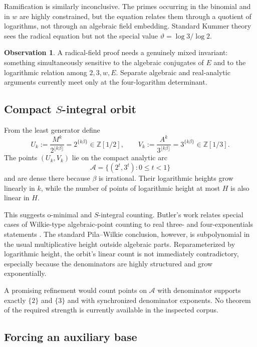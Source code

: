 \documentclass[11pt,oneside]{article}
\theoremstyle{definition}
\newtheorem{observation}[theorem]{Observation}
\theoremstyle{remark}
\newcommand{\Z}{\mathbb Z}
\newcommand{\thetaq}{\vartheta}
\begin{document}
Ramification is similarly inconclusive.  The primes occurring in the binomial and in $w$ are
highly constrained, but the equation relates them through a quotient of logarithms, not
through an algebraic field embedding.  Standard Kummer theory sees the radical equation but
not the special value $\thetaq=\log3/\log2$.

\begin{observation}
A radical-field proof needs a genuinely mixed invariant: something simultaneously sensitive
to the algebraic conjugates of $E$ and to the logarithmic relation among $2,3,w,E$.  Separate
algebraic and real-analytic arguments currently meet only at the four-logarithm determinant.
\end{observation}

\subsection{Compact $S$-integral orbit}

From the least generator define
\[
 U_k:=\frac{M^k}{2^{\lfloor k\beta\rfloor}}
     =2^{\{k\beta\}}\in\Z[1/2],
 \qquad
 V_k:=\frac{A^k}{3^{\lfloor k\beta\rfloor}}
     =3^{\{k\beta\}}\in\Z[1/3].
 \label{eq:S-orbit}
\]
The points $(U_k,V_k)$ lie on the compact analytic arc
\[
 \mathcal A=\{(2^t,3^t):0\le t<1\}
\]
and are dense there because $\beta$ is irrational.  Their logarithmic heights grow linearly
in $k$, while the number of points of logarithmic height at most $H$ is also linear in $H$.

This suggests o-minimal and $S$-integral counting.  Butler's work relates special cases of
Wilkie-type algebraic-point counting to real three- and four-exponentials statements
\cite{Butler2017}.  The
standard Pila--Wilkie conclusion, however, is subpolynomial in the usual multiplicative height
outside algebraic parts.  Reparameterized by logarithmic height, the orbit's linear count is
not immediately contradictory, especially because the denominators are highly structured and
grow exponentially.

A promising refinement would count points on $\mathcal A$ with denominator supports exactly
$\{2\}$ and $\{3\}$ and with synchronized denominator exponents.  No theorem of the required
strength is currently available in the inspected corpus.

\subsection{Forcing an auxiliary base}
\end{document}
